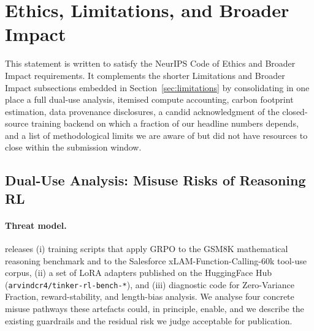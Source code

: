 
\section{Ethics, Limitations, and Broader Impact}
\label{sec:impact_standalone}

This statement is written to satisfy the NeurIPS Code of Ethics and Broader
Impact requirements. It complements the shorter Limitations and Broader
Impact subsections embedded in Section~\ref{sec:limitations} by consolidating
in one place a full dual-use analysis, itemised compute accounting, carbon
footprint estimation, data provenance disclosures, a candid acknowledgment
of the closed-source training backend on which a fraction of our headline
numbers depends, and a list of methodological limits we are aware of but
did not have resources to close within the submission window.

\subsection{Dual-Use Analysis: Misuse Risks of Reasoning RL}
\label{sec:dualuse}

\paragraph{Threat model.}
\ours{} releases (i) training scripts that apply GRPO to the GSM8K
\cite{cobbe2021training} mathematical reasoning benchmark and to the
Salesforce xLAM-Function-Calling-60k \cite{liu2024xlam} tool-use corpus,
(ii) a set of LoRA adapters published on the HuggingFace Hub
(\texttt{arvindcr4/tinker-rl-bench-*}), and (iii) diagnostic code for
Zero-Variance Fraction, reward-stability, and length-bias analysis. We
analyse four concrete misuse pathways these artefacts could, in principle,
enable, and we describe the existing guardrails and the residual risk we
judge acceptable for publication.

